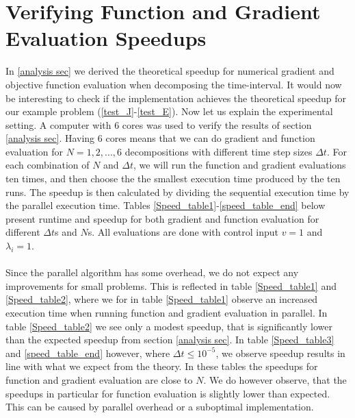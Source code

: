 \section{Verifying Function and Gradient Evaluation Speedups} \label{ver S sec}
In \ref{analysis sec} we derived the theoretical speedup for numerical gradient and objective function evaluation when decomposing the time-interval. It would now be interesting to check if the implementation achieves the theoretical speedup for our example problem (\ref{test_J}-\ref{test_E}). Now let us explain the experimental setting. A computer with 6 cores was used to verify the results of section \ref{analysis sec}. Having 6 cores means that we can do gradient and function evaluation for $N=1,2,...,6$ decompositions with different time step sizes $\Delta t$. For each combination of $N$ and $\Delta t$, we will run the function and gradient evaluations ten times, and then choose the the smallest execution time produced by the ten runs. The speedup is then calculated by dividing the sequential execution time by the parallel execution time. Tables \ref{Speed_table1}-\ref{speed_table_end} below present runtime and speedup for both gradient and function evaluation for different $\Delta t$s and $N$s. All evaluations are done with control input $v=1$ and $\lambda_i=1$.  
\\
\\
Since the parallel algorithm has some overhead, we do not expect any improvements for small problems. This is reflected in table \ref{Speed_table1} and \ref{Speed_table2}, where we for in table \ref{Speed_table1} observe an increased execution time when running function and gradient evaluation in parallel. In table \ref{Speed_table2} we see only a modest speedup, that is significantly lower than the expected speedup from section \ref{analysis sec}. In table \ref{Speed_table3} and \ref{speed_table_end} however, where $\Delta t \leq 10^{-5}$, we observe speedup results in line with what we expect from the theory. In these tables the speedups for function and gradient evaluation are close to $N$. We do however observe, that the speedups in particular for function evaluation is slightly lower than expected. This can be caused by parallel overhead or a suboptimal implementation. 
\\
